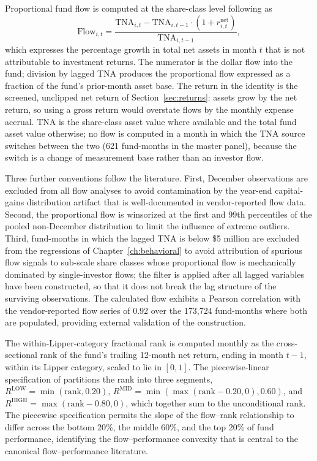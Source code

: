 \documentclass[12pt, oneside]{report}
\begin{document}
\noindent Proportional fund flow is computed at the share-class level
following \textcite{SirriTufano1998} as
\begin{equation}
\text{Flow}_{i,t} = \frac{\text{TNA}_{i,t} - \text{TNA}_{i,t-1}
\cdot (1 + r^{\text{net}}_{i,t})}{\text{TNA}_{i,t-1}},
\label{eq:flow}
\end{equation}
which expresses the percentage growth in total net assets in month $t$
that is not attributable to investment returns. The numerator is the
dollar flow into the fund; division by lagged TNA produces the
proportional flow expressed as a fraction of the fund's prior-month
asset base. The return in the identity is the screened, unclipped net
return of Section~\ref{sec:returns}: assets grow by the net return, so
using a gross return would overstate flows by the monthly expense
accrual. TNA is the share-class asset value where available and the
total fund asset value otherwise; no flow is computed in a month in which
the TNA source switches between the two (621 fund-months in the
master panel), because the switch is a change of measurement base rather
than an investor flow.

Three further conventions follow the literature. First, December
observations are excluded from all flow analyses to avoid contamination
by the year-end capital-gains distribution artifact that is
well-documented in vendor-reported flow data. Second, the proportional
flow is winsorized at the first and 99th percentiles of the pooled
non-December distribution to limit the influence of extreme outliers.
Third, fund-months in which the lagged TNA is below \$5 million are
excluded from the regressions of Chapter~\ref{ch:behavioral} to avoid
attribution of spurious flow signals to sub-scale share classes whose
proportional flow is mechanically dominated by single-investor flows;
the filter is applied after all lagged variables have been constructed,
so that it does not break the lag structure of the surviving
observations. The calculated flow exhibits a Pearson correlation with
the vendor-reported flow series of 0.92 over the 173{,}724 fund-months
where both are populated, providing external validation of the
construction.

The within-Lipper-category fractional rank is computed monthly 
as the cross-sectional rank of the fund's trailing
12-month net return, ending in month $t-1$, within its Lipper category, scaled to lie in
$[0, 1]$. The piecewise-linear specification of \textcite{SirriTufano1998}
partitions the rank into three segments,
$R^{\text{LOW}} = \min(\text{rank}, 0.20)$,
$R^{\text{MID}} = \min(\max(\text{rank} - 0.20, 0), 0.60)$, and
$R^{\text{HIGH}} = \max(\text{rank} - 0.80, 0)$, which together sum
to the unconditional rank. The piecewise specification permits the
slope of the flow--rank relationship to differ across the bottom 20\%,
the middle 60\%, and the top 20\% of fund performance, identifying the
flow--performance convexity that is central to the canonical
flow--performance literature.
\end{document}
